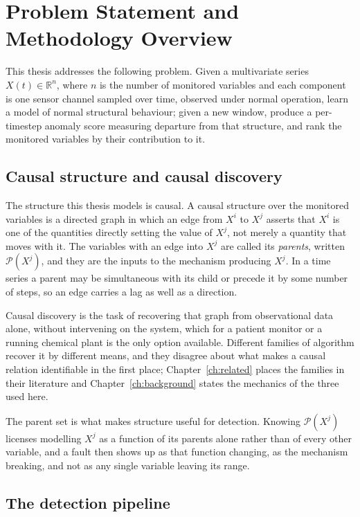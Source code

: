 \section{Problem Statement and Methodology Overview}
\label{sec:problem}

This thesis addresses the following problem. Given a multivariate series $X(t) \in \mathbb{R}^n$, where $n$ is the number of monitored variables and each component is one sensor channel sampled over time, observed under normal operation, learn a model of normal structural behaviour; given a new window, produce a per-timestep anomaly score measuring departure from that structure, and rank the monitored variables by their contribution to it.

\subsection{Causal structure and causal discovery}
\label{sec:intro-causal}

The structure this thesis models is causal. A causal structure over the monitored variables is a directed graph in which an edge from $X^i$ to $X^j$ asserts that $X^i$ is one of the quantities directly setting the value of $X^j$, not merely a quantity that moves with it. The variables with an edge into $X^j$ are called its \emph{parents}, written $\mathcal{P}(X^j)$, and they are the inputs to the mechanism producing $X^j$. In a time series a parent may be simultaneous with its child or precede it by some number of steps, so an edge carries a lag as well as a direction.

Causal discovery is the task of recovering that graph from observational data alone, without intervening on the system, which for a patient monitor or a running chemical plant is the only option available. Different families of algorithm recover it by different means, and they disagree about what makes a causal relation identifiable in the first place; Chapter~\ref{ch:related} places the families in their literature and Chapter~\ref{ch:background} states the mechanics of the three used here.

The parent set is what makes structure useful for detection. Knowing $\mathcal{P}(X^j)$ licenses modelling $X^j$ as a function of its parents alone rather than of every other variable, and a fault then shows up as that function changing, as the mechanism breaking, and not as any single variable leaving its range.

\subsection{The detection pipeline}
\label{sec:intro-pipeline}

